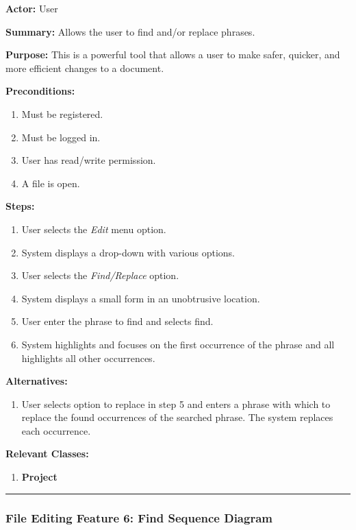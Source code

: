 \documentclass[twoside,letterpaper]{article}
\begin{document}
	\noindent\textbf{Actor:} User \newline
	
	\noindent\textbf{Summary:} Allows the user to find and/or replace phrases. \newline
	
	\noindent\textbf{Purpose:} This is a powerful tool that allows a user to make safer, quicker, and more efficient changes to a document. \newline
	
	\noindent\textbf{Preconditions:}
	\begin{enumerate}
		\item Must be registered.
		\item Must be logged in.
		\item User has read/write permission.
		\item A file is open.
	\end{enumerate}
	\noindent\textbf{Steps:}
	\begin{enumerate}
		\item User selects the \textit{Edit} menu option.
		\item System displays a drop-down with various options.
		\item User selects the \textit{Find/Replace} option.
		\item System displays a small form in an unobtrusive location.
		\item User enter the phrase to find and selects find.
		\item System highlights and focuses on the first occurrence of the phrase and all highlights all other occurrences.
	\end{enumerate}
	\noindent\textbf{Alternatives:}
	\begin{enumerate}
		\item User selects option to replace in step 5 and enters a phrase with which to replace the found occurrences of the searched phrase. The system replaces each occurrence.
	\end{enumerate}
	\noindent\textbf{Relevant Classes:}
	\begin{enumerate}
		\item \textbf{Project}
	\end{enumerate}
\hrule
\vspace{8pt}
\newpage

\subsubsection[File Editing Feature 6: Find Sequence Diagram]{\rmfamily\bfseries\color{black}
	File Editing Feature 6: Find Sequence Diagram}
\hypertarget{RefHeading22059017292}{}
\end{document}
